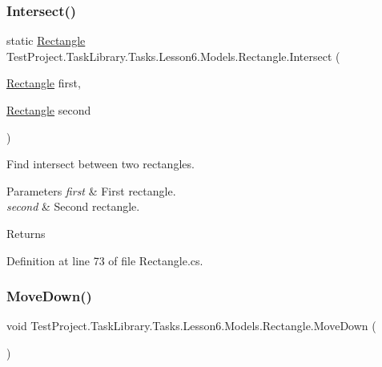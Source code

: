 \subsubsection{\texorpdfstring{Intersect()}{Intersect()}}
{\footnotesize\ttfamily static \mbox{\hyperlink{class_test_project_1_1_task_library_1_1_tasks_1_1_lesson6_1_1_models_1_1_rectangle}{Rectangle}} Test\+Project.\+Task\+Library.\+Tasks.\+Lesson6.\+Models.\+Rectangle.\+Intersect (\begin{DoxyParamCaption}\item[{\mbox{\hyperlink{class_test_project_1_1_task_library_1_1_tasks_1_1_lesson6_1_1_models_1_1_rectangle}{Rectangle}}}]{first,  }\item[{\mbox{\hyperlink{class_test_project_1_1_task_library_1_1_tasks_1_1_lesson6_1_1_models_1_1_rectangle}{Rectangle}}}]{second }\end{DoxyParamCaption})\hspace{0.3cm}{\ttfamily [static]}}



Find intersect between two rectangles. 


\begin{DoxyParams}{Parameters}
{\em first} & First rectangle.\\
\hline
{\em second} & Second rectangle.\\
\hline
\end{DoxyParams}
\begin{DoxyReturn}{Returns}

\end{DoxyReturn}


Definition at line 73 of file Rectangle.\+cs.

\mbox{\label{class_test_project_1_1_task_library_1_1_tasks_1_1_lesson6_1_1_models_1_1_rectangle_a46416a1374137c9536a3cf0eae8fd2f8}} 
\subsubsection{\texorpdfstring{MoveDown()}{MoveDown()}}
{\footnotesize\ttfamily void Test\+Project.\+Task\+Library.\+Tasks.\+Lesson6.\+Models.\+Rectangle.\+Move\+Down (\begin{DoxyParamCaption}{ }\end{DoxyParamCaption})}



